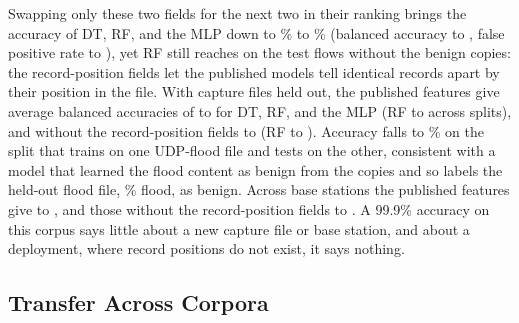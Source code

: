 \documentclass{ieeeaccess}
\newcommand{\DB}{\ensuremath{\mathcal{D}_{B}}}
\begin{document}
Swapping only these two fields for the next two in their ranking brings the accuracy of DT, RF, and the MLP down to \PubOneNoposAccMin\% to \PubOneNoposAccMax\% (balanced accuracy \PubOneNoposBAmin{} to \PubOneNoposBAmax{}, false positive rate \PubOneNoposFPRmin{} to \PubOneNoposFPRmax), yet RF still reaches \PubOneRFclean{} on the test flows without the benign copies: the record-position fields let the published models tell identical records apart by their position in the file. With capture files held out, the published features give average balanced accuracies of \PubTwoPubBAmin{} to \PubTwoPubBAmax{} for DT, RF, and the MLP (RF \PubTwoPubFoldMin{} to \PubTwoPubFoldMax{} across splits), and without the record-position fields \PubTwoNoposBAmin{} to \PubTwoNoposBAmax{} (RF \PubTwoNoposFoldMin{} to \PubTwoNoposFoldMax{}). Accuracy falls to \PubTwoNoposFoldAccMin\% on the split that trains on one UDP-flood file and tests on the other, consistent with a model that learned the flood content as benign from the copies and so labels the held-out flood file, \LcAttackFileConf\% flood, as benign. Across base stations the published features give \PubThreePubBAmin{} to \PubThreePubBAmax{}, and those without the record-position fields \PubThreeNoposBAmin{} to \PubThreeNoposBAmax{}. A 99.9\% accuracy on this corpus says little about a new capture file or base station, and about a deployment, where record positions do not exist, it says nothing.
\begin{table}[t]
\caption{The 5G-NIDD authors' pipeline~\cite{samarakoon2022niddarxiv} reproduced and moved one step per rung (R0: their protocol). Balanced accuracy on all \DB{} flows, and for RF also balanced accuracy and false positive rate without the benign copies. Pass: classifiers passing the deployability test on all flows / without the copies (Section~\ref{sec:disc:predicate}). KNN runs at R0 only, as its prediction on later rungs dominated the runtime.}
\label{tab:ladder}
\centering
\footnotesize

\end{table}
\subsection{Transfer Across Corpora}
\label{sec:res:transfer}
\end{document}
